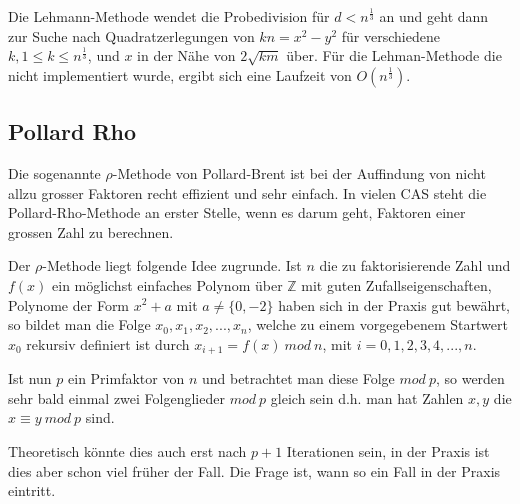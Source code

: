 \documentclass[a4paper,11pt]{article}
\begin{document}
Die Lehmann-Methode wendet die Probedivision für $d<n^\frac{1}{3}$ an und geht dann
zur Suche nach Quadratzerlegungen von
$kn = x^2 - y^2$ für verschiedene $k, 1\leq k \leq n^{\frac{1}{3}}$, und $x$ in der
Nähe von $2\sqrt{km}$ über. Für die Lehman-Methode die nicht implementiert wurde,
ergibt sich eine Laufzeit von $O(n^{\frac{1}{3}})$.

\subsection{Pollard Rho}

Die sogenannte $\rho$-Methode von Pollard-Brent ist bei der Auffindung
von nicht allzu grosser Faktoren recht effizient und sehr einfach. In
vielen CAS steht die Pollard-Rho-Methode an erster Stelle, wenn es darum
geht, Faktoren einer grossen Zahl zu berechnen.

Der $\rho$-Methode liegt folgende Idee zugrunde. Ist $n$ die zu
faktorisierende Zahl und $f(x)$ ein möglichst einfaches Polynom
über ${\mathbb Z}$ mit guten Zufallseigenschaften, Polynome der
Form $x^2+a$ mit $ a \neq \{0,-2\}$ haben sich in der Praxis gut
bewährt, so bildet man die  Folge $x_0, x_1, x_2,..., x_n$, welche zu
einem vorgegebenem Startwert $x_0$ rekursiv definiert ist durch
 $x_{i+1} = f(x)\ mod\ n$, mit $i = 0,1,2,3,4,..., n$.

Ist nun $p$ ein Primfaktor von $n$ und betrachtet man diese Folge $mod\ p$,
so werden sehr bald einmal zwei Folgenglieder $mod\ p$ gleich sein d.h. man
hat Zahlen $x,y$ die $x\equiv y\ mod\ p$ sind.

Theoretisch könnte dies auch erst nach $p+1$ Iterationen sein, in der Praxis
ist dies aber schon viel früher der Fall. Die Frage ist, wann so ein
Fall in der Praxis eintritt.
\end{document}
